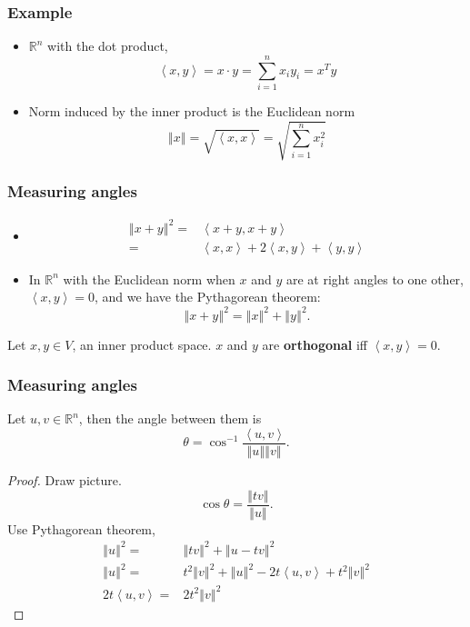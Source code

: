 \documentclass[compress]{beamer}
\def\R{\mathbb{R}}
\newcommand{\iprod}[2]{\left\langle {#1} , {#2} \right\rangle}
\newcommand{\norm}[1]{\left\Vert {#1} \right\Vert}
\begin{document}
\begin{frame}
  \frametitle{Example}
  \begin{itemize}
  \item $\R^n$ with the dot product,
    \[ \iprod{x}{y} = x\cdot y = \sum_{i=1}^n x_i y_i = x^T y \] 
  \item Norm induced by the inner product is the Euclidean norm
    \[ \norm{x} = \sqrt{\iprod{x}{x}} = \sqrt{\sum_{i=1}^n x_i^2 } \]
  \end{itemize}
\end{frame}

\begin{frame}
  \frametitle{Measuring angles}
  \begin{itemize}
  \item \begin{align*}
      \norm{x + y}^2 = & \iprod{x+y}{x+y} \\
      = & \iprod{x}{x} + 2\iprod{x}{y} + \iprod{y}{y}
    \end{align*}
  \item In $\R^n$ with the Euclidean norm when $x$ and $y$ are at
    right angles 
    to one other, $\iprod{x}{y} = 0$, and we have the Pythagorean theorem:
    \[ \norm{x + y}^2 = \norm{x}^2 + \norm{y}^2. \]
  \end{itemize}
  
  \begin{definition}
    Let $x,y \in V$, an inner product space. $x$ and $y$ are
    \textbf{orthogonal} iff $\iprod{x}{y} = 0$. 
  \end{definition}
\end{frame}

\begin{frame}
  \frametitle{Measuring angles}
  \begin{theorem}\label{thm:angle}
    Let $u, v \in \R^n$, then the angle between them is
    \[ \theta = \cos^{-1} \frac{\iprod{u}{v}}{\norm{u}\norm{v}}. \]  
  \end{theorem}
  \begin{proof}
    Draw picture.
    \[ \cos \theta = \frac{\norm{tv}}{\norm{u}}. \]
    Use Pythagorean theorem,
    \begin{align*}
      \norm{u}^2 = & \norm{tv}^2 + \norm{u - tv}^2 \\
      \norm{u}^2 = & t^2 \norm{v}^2 + \norm{u}^2 - 2t\iprod{u}{v} + t^2
      \norm{v}^2 
      \\
      2 t \iprod{u}{v} = & 2 t^2 \norm{v}^2 
    \end{align*}
  \end{proof}
\end{frame}
\end{document}
